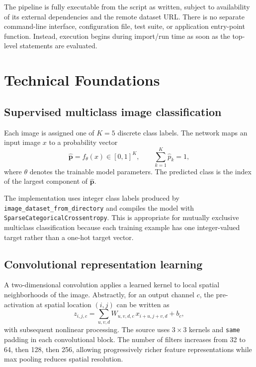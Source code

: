 \documentclass[11pt,a4paper]{article}
\newcommand{\code}[1]{\texttt{#1}}
\begin{document}
The pipeline is fully executable from the script as written, subject to availability of its external dependencies and the remote dataset URL. There is no separate command-line interface, configuration file, test suite, or application entry-point function. Instead, execution begins during import/run time as soon as the top-level statements are evaluated.

\section{Technical Foundations}
\subsection{Supervised multiclass image classification}
Each image is assigned one of $K=5$ discrete class labels. The network maps an input image $x$ to a probability vector
\begin{equation}
\hat{\mathbf{p}} = f_{\theta}(x) \in [0,1]^K,
\qquad
\sum_{k=1}^{K}\hat{p}_k = 1,
\end{equation}
where $\theta$ denotes the trainable model parameters. The predicted class is the index of the largest component of $\hat{\mathbf{p}}$.

The implementation uses integer class labels produced by \code{image\_dataset\_from\_directory} and compiles the model with \code{SparseCategoricalCrossentropy}. This is appropriate for mutually exclusive multiclass classification because each training example has one integer-valued target rather than a one-hot target vector.

\subsection{Convolutional representation learning}
A two-dimensional convolution applies a learned kernel to local spatial neighborhoods of the image. Abstractly, for an output channel $c$, the pre-activation at spatial location $(i,j)$ can be written as
\begin{equation}
z_{i,j,c}
=
\sum_{u,v,d}
W_{u,v,d,c}\,x_{i+u,j+v,d} + b_c,
\end{equation}
with subsequent nonlinear processing. The source uses $3\times3$ kernels and \code{same} padding in each convolutional block. The number of filters increases from 32 to 64, then 128, then 256, allowing progressively richer feature representations while max pooling reduces spatial resolution.
\end{document}

